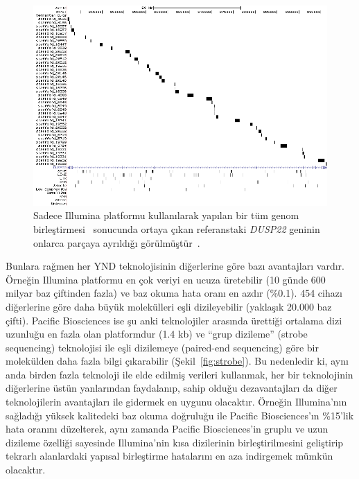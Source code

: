 \documentclass[11pt]{article}
\begin{document}
\begin{figure}[htb]
\begin{center}
  \includegraphics[scale=0.45]{shatter.png}
\end{center}
\caption{Sadece Illumina platformu kullanılarak yapılan bir tüm genom birleştirmesi~\cite{Li2010b} sonucunda ortaya çıkan referanstaki {\it DUSP22} geninin onlarca parçaya ayrıldığı görülmüştür~\cite{Alkan2011c}.}
\label{fig:shatter}
\end{figure}



Bunlara rağmen her YND teknolojisinin diğerlerine göre bazı avantajları vardır. Örneğin Illumina platformu en çok veriyi en ucuza üretebilir (10 günde 600 milyar baz çiftinden fazla) ve baz okuma hata oranı en azdır (\%0.1). 454 cihazı diğerlerine göre daha büyük molekülleri eşli dizileyebilir (yaklaşık 20.000 baz çifti). Pacific Biosciences ise şu anki teknolojiler arasında ürettiği ortalama dizi uzunluğu en fazla olan platformdur (1.4 kb) ve ``grup dizileme'' (strobe sequencing) teknolojisi ile eşli dizilemeye (paired-end sequencing) göre bir molekülden daha fazla bilgi çıkarabilir (Şekil~\ref{fig:strobe}). Bu nedenledir ki, aynı anda birden fazla teknoloji ile elde edilmiş verileri kullanmak, her bir teknolojinin diğerlerine üstün yanlarından faydalanıp, sahip olduğu dezavantajları da diğer teknolojilerin avantajları ile gidermek en uygunu olacaktır. Örneğin Illumina'nın sağladığı yüksek kalitedeki baz okuma doğruluğu ile Pacific Biosciences'ın \%15'lik hata oranını düzelterek, aynı zamanda Pacific Biosciences'in gruplu ve uzun dizileme özelliği sayesinde Illumina'nin kısa dizilerinin birleştirilmesini geliştirip tekrarlı alanlardaki yapısal birleştirme hatalarını en aza indirgemek mümkün olacaktır.
\end{document}
